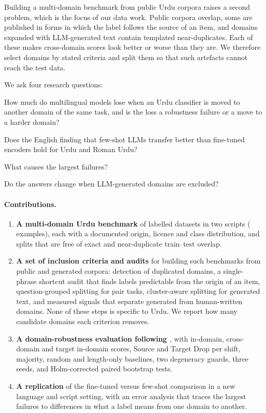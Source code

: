 \documentclass[acmsmall,screen]{acmart}
\begin{document}
Building a multi-domain benchmark from public Urdu corpora raises a second problem, which is the focus of our data work. Public corpora overlap, some are published in forms in which the label follows the source of an item, and domains expanded with LLM-generated text contain templated near-duplicates. Each of these makes cross-domain scores look better or worse than they are. We therefore select domains by stated criteria and split them so that such artefacts cannot reach the test data.

We ask four research questions:
\begin{description}[leftmargin=1.2cm,labelwidth=1cm,itemsep=1pt,font=\normalfont\bfseries]
\item[RQ1] How much do multilingual models lose when an Urdu classifier is moved to another domain of the same task, and is the loss a robustness failure or a move to a harder domain?
\item[RQ2] Does the English finding that few-shot LLMs transfer better than fine-tuned encoders hold for Urdu and Roman Urdu?
\item[RQ3] What causes the largest failures?
\item[RQ4] Do the answers change when LLM-generated domains are excluded?
\end{description}

\paragraph{Contributions.}
\begin{enumerate}[leftmargin=*,itemsep=2pt]
\item \textbf{A multi-domain Urdu benchmark} of \NumDomains{} labelled datasets in two scripts (\NumTotal{} examples), each with a documented origin, licence and class distribution, and splits that are free of exact and near-duplicate train--test overlap.
\item \textbf{A set of inclusion criteria and audits} for building such benchmarks from public and generated corpora: detection of duplicated domains, a single-phrase shortcut audit that finds labels predictable from the origin of an item, question-grouped splitting for pair tasks, cluster-aware splitting for generated text, and measured signals that separate generated from human-written domains. None of these steps is specific to Urdu. We report how many candidate domains each criterion removes.
\item \textbf{A domain-robustness evaluation following \citet{calderon2024measuring}}, with in-domain, cross-domain and target in-domain scores, Source and Target Drop per shift, majority, random and length-only baselines, two degeneracy guards, three seeds, and Holm-corrected paired bootstrap tests.
\item \textbf{A replication} of the fine-tuned versus few-shot comparison in a new language and script setting, with an error analysis that traces the largest failures to differences in what a label means from one domain to another.
\end{enumerate}
\end{document}
